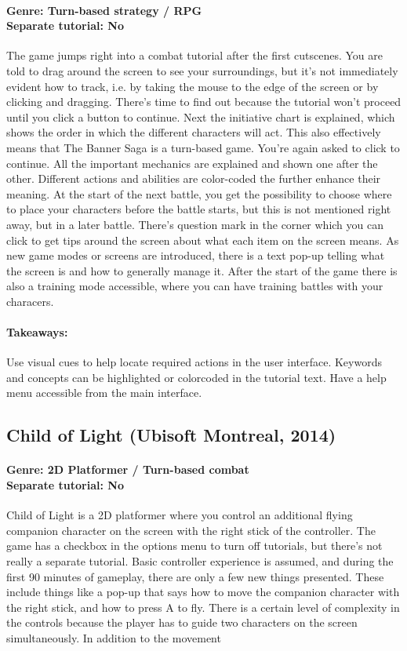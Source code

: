 \paragraph{Genre: Turn-based strategy / RPG \\ Separate tutorial: No \\}
The game jumps right into a combat tutorial after the first cutscenes. You are told to drag around the screen to see your surroundings, but it's not immediately evident how to track, i.e. by taking the mouse to the edge of the screen or by clicking and dragging. There's time to find out because the tutorial won't proceed until you click a button to continue. Next the initiative chart is explained, which shows the order in which the different characters will act. This also effectively means that The Banner Saga is a turn-based game. You're again asked to click to continue. All the important mechanics are explained and shown one after the other. Different actions and abilities are color-coded the further enhance their meaning. At the start of the next battle, you get the possibility to choose where to place your characters before the battle starts, but this is not mentioned right away, but in a later battle. There's question mark in the corner which you can click to get tips around the screen about what each item on the screen means. As new game modes or screens are introduced, there is a text pop-up telling what the screen is and how to generally manage it. After the start of the game there is also a training mode accessible, where you can have training battles with your characers.
\paragraph{Takeaways:}
Use visual cues to help locate required actions in the user interface. Keywords and concepts can be highlighted or colorcoded in the tutorial text. Have a help menu accessible from the main interface.

\subsection{Child of Light (Ubisoft Montreal, 2014)}
\paragraph{Genre: 2D Platformer / Turn-based combat \\ Separate tutorial: No \\}
Child of Light is a 2D platformer where you control an additional flying companion character on the screen with the right stick of the controller. The game has a checkbox in the options menu to turn off tutorials, but there's not really a separate tutorial. Basic controller experience is assumed, and during the first 90 minutes of gameplay, there are only a few new things presented. These include things like a pop-up that says how to move the companion character with the right stick, and how to press A to fly. There is a certain level of complexity in the controls because the player has to guide two characters on the screen simultaneously. In addition to the movement
